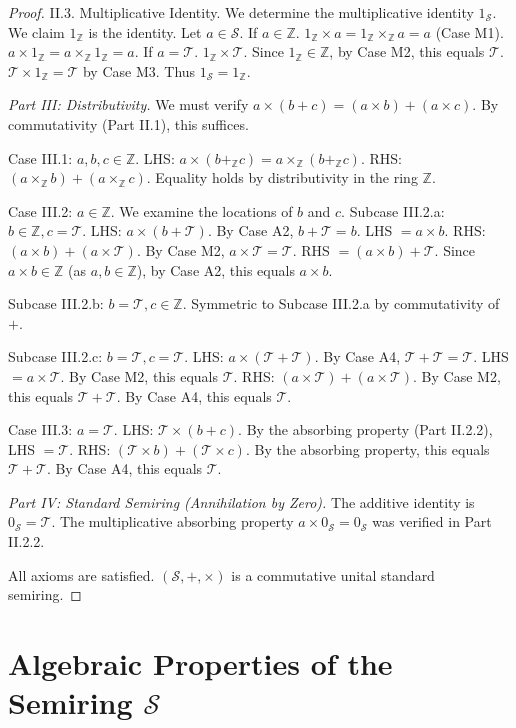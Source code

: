 \documentclass[11pt, a4paper]{article}
\theoremstyle{plain}
\theoremstyle{definition}
\numberwithin{equation}{section}
\newcommand{\Z}{\mathbb{Z}}
\newcommand{\Tobj}{\mathcal{T}} %
\newcommand{\SemiringS}{\mathcal{S}}
\begin{document}
\begin{proof}
II.3. Multiplicative Identity. We determine the multiplicative identity $1_{\SemiringS}$. We claim $1_{\Z}$ is the identity.
Let $a \in \SemiringS$.
If $a \in \Z$. $1_{\Z}\times a = 1_{\Z}\times_{\Z} a = a$ (Case M1). $a\times 1_{\Z} = a\times_{\Z} 1_{\Z} = a$.
If $a=\Tobj$. $1_{\Z}\times\Tobj$. Since $1_{\Z} \in \Z$, by Case M2, this equals $\Tobj$. $\Tobj\times 1_{\Z} = \Tobj$ by Case M3.
Thus $1_{\SemiringS}=1_{\Z}$.

\emph{Part III: Distributivity.}
We must verify $a\times(b+c) = (a\times b) + (a\times c)$. By commutativity (Part II.1), this suffices.

Case III.1: $a, b, c \in \Z$.
LHS: $a\times(b+_{\Z} c) = a\times_{\Z}(b+_{\Z} c)$.
RHS: $(a\times_{\Z} b) + (a\times_{\Z} c)$.
Equality holds by distributivity in the ring $\Z$.

Case III.2: $a \in \Z$. We examine the locations of $b$ and $c$.
Subcase III.2.a: $b \in \Z, c=\Tobj$.
LHS: $a\times(b+\Tobj)$. By Case A2, $b+\Tobj=b$. LHS $= a\times b$.
RHS: $(a\times b) + (a\times\Tobj)$. By Case M2, $a\times\Tobj=\Tobj$. RHS $= (a\times b) + \Tobj$.
Since $a\times b \in \Z$ (as $a, b \in \Z$), by Case A2, this equals $a\times b$.

Subcase III.2.b: $b=\Tobj, c \in \Z$. Symmetric to Subcase III.2.a by commutativity of $+$.

Subcase III.2.c: $b=\Tobj, c=\Tobj$.
LHS: $a\times(\Tobj+\Tobj)$. By Case A4, $\Tobj+\Tobj=\Tobj$. LHS $= a\times\Tobj$. By Case M2, this equals $\Tobj$.
RHS: $(a\times\Tobj) + (a\times\Tobj)$. By Case M2, this equals $\Tobj+\Tobj$. By Case A4, this equals $\Tobj$.

Case III.3: $a=\Tobj$.
LHS: $\Tobj\times(b+c)$. By the absorbing property (Part II.2.2), LHS $=\Tobj$.
RHS: $(\Tobj\times b) + (\Tobj\times c)$. By the absorbing property, this equals $\Tobj+\Tobj$. By Case A4, this equals $\Tobj$.

\emph{Part IV: Standard Semiring (Annihilation by Zero).}
The additive identity is $0_{\SemiringS}=\Tobj$. The multiplicative absorbing property $a\times 0_{\SemiringS} = 0_{\SemiringS}$ was verified in Part II.2.2.

All axioms are satisfied. $(\SemiringS, +, \times)$ is a commutative unital standard semiring.
\end{proof}

\section{Algebraic Properties of the Semiring $\SemiringS$}
\end{document}

